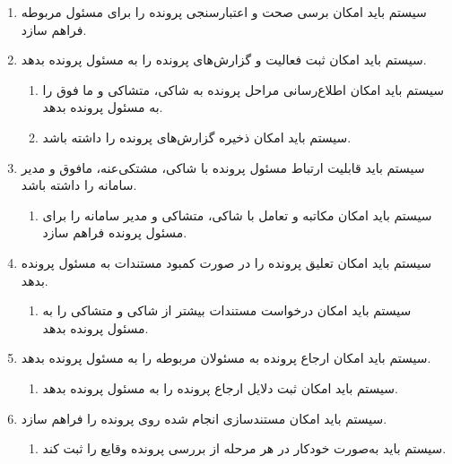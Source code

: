 \documentclass[12pt,a4paper,oneside]{article}
\begin{document}
\begin{itemize}
\begin{enumerate}
        \item 
        سیستم باید امکان برسی صحت و اعتبارسنجی پرونده را برای مسئول مربوطه فراهم سازد.

        \item 
        سیستم باید امکان ثبت فعالیت و گزارش‌های پرونده را به مسئول پرونده بدهد.
        \begin{enumerate}
            \renewcommand{\labelenumii}{\textbf{.R\arabic{enumi}.\arabic{enumii}}}
            \item 
            سیستم باید امکان اطلاع‌رسانی مراحل پرونده به شاکی، متشاکی و ما فوق را به مسئول پرونده بدهد.
            \item 
            سیستم باید امکان ذخیره گزارش‌های پرونده را داشته باشد.
        \end{enumerate}

        \item 
        سیستم باید قابلیت ارتباط مسئول پرونده با شاکی، مشتکی‌عنه، مافوق و مدیر سامانه را داشته باشد.
        \begin{enumerate}
            \renewcommand{\labelenumii}{\textbf{.R\arabic{enumi}.\arabic{enumii}}}
            \item 
            سیستم باید امکان مکاتبه و تعامل با شاکی، متشاکی و مدیر سامانه را برای مسئول پرونده فراهم سازد.
        \end{enumerate}

        \item 
        سیستم باید امکان تعلیق پرونده را در صورت کمبود مستندات به مسئول پرونده بدهد.
        \begin{enumerate}
            \renewcommand{\labelenumii}{\textbf{.R\arabic{enumi}.\arabic{enumii}}}
            \item 
            سیستم باید امکان درخواست مستندات بیشتر از شاکی و متشاکی را به مسئول پرونده بدهد.
        \end{enumerate}

        \item 
        سیستم باید امکان ارجاع پرونده به مسئولان مربوطه را به مسئول پرونده بدهد.
        \begin{enumerate}
            \renewcommand{\labelenumii}{\textbf{.R\arabic{enumi}.\arabic{enumii}}}
            \item 
            سیستم باید امکان ثبت دلایل ارجاع پرونده را به مسئول پرونده بدهد.
        \end{enumerate}

        \item 
        سیستم باید امکان مستندسازی انجام شده روی پرونده را فراهم سازد.
        \begin{enumerate}
            \renewcommand{\labelenumii}{\textbf{.R\arabic{enumi}.\arabic{enumii}}}
            \item 
            سیستم باید به‌صورت خودکار در هر مرحله از بررسی پرونده وقایع را ثبت کند.
        \end{enumerate}


\end{enumerate}
\end{itemize}
\end{document}
